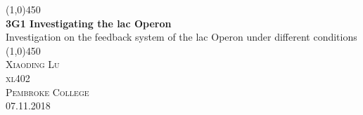 \documentclass{article}
\begin{document}
\begin{titlepage}
	\begin{center}
	\line(1,0){450}\\
	[0.25in]
	\huge{\bfseries 3G1 Investigating the lac Operon} \\
	[0.25in]
     \large Investigation on the feedback system of the lac Operon under different conditions\\
     \line(1,0){450} \\
	[12cm]
	\textsc{\Large Xiaoding Lu \\[1cm] xl402 \\ Pembroke College \\[1.2cm] 07.11.2018}\\
	\end{center}
	\begin{flushright}

	\begin{figure}[htp]
	\begin{flushright}
	\end{flushright}
	\end{figure}
	\end{flushright}

\vspace{2cm}

\end{titlepage}

\cleardoublepage
{}
\cleardoublepage
{}
\end{document}
